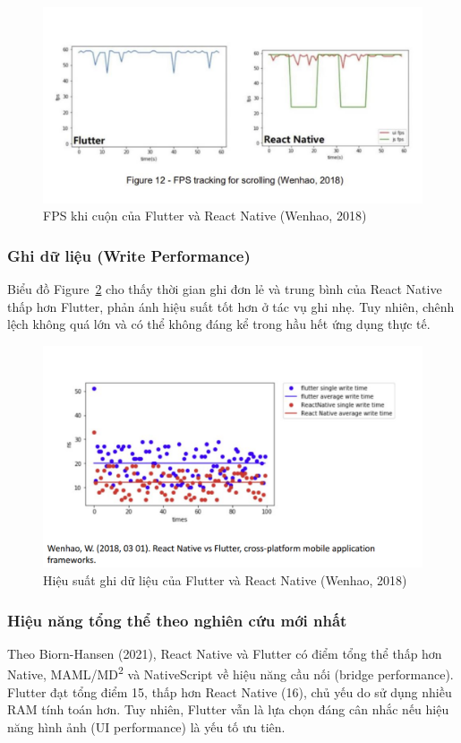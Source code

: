 \begin{figure}[H]
    \centering
    \includegraphics[width=0.8\linewidth]{images/scrolling.png}
    \caption{FPS khi cuộn của Flutter và React Native (Wenhao, 2018)}
    \label{fig:scrolling}
\end{figure}

\subsubsection{Ghi dữ liệu (Write Performance)}
\begin{flushleft}
  \hspace*{0.8cm}Biểu đồ Figure~\ref{fig:write} cho thấy thời gian ghi đơn lẻ và trung bình của React Native thấp hơn Flutter, phản ánh hiệu suất tốt hơn ở tác vụ ghi nhẹ. Tuy nhiên, chênh lệch không quá lớn và có thể không đáng kể trong hầu hết ứng dụng thực tế.
\end{flushleft}

\begin{figure}[H]
    \centering
    \includegraphics[width=0.8\linewidth]{images/read_write.png}
    \caption{Hiệu suất ghi dữ liệu của Flutter và React Native (Wenhao, 2018)}
    \label{fig:write}
\end{figure}

\subsubsection{Hiệu năng tổng thể theo nghiên cứu mới nhất}
\begin{flushleft}
  \hspace*{0.8cm}Theo Biorn-Hansen (2021), React Native và Flutter có điểm tổng thể thấp hơn Native, MAML/MD\textsuperscript{2} và NativeScript về hiệu năng cầu nối (bridge performance). Flutter đạt tổng điểm 15, thấp hơn React Native (16), chủ yếu do sử dụng nhiều RAM tính toán hơn. Tuy nhiên, Flutter vẫn là lựa chọn đáng cân nhắc nếu hiệu năng hình ảnh (UI performance) là yếu tố ưu tiên.
\end{flushleft}

